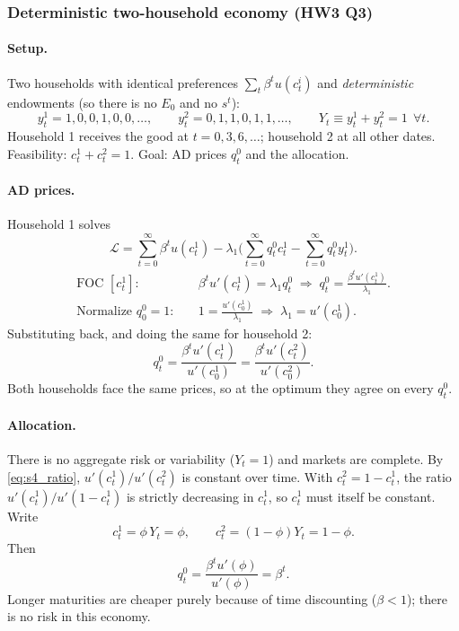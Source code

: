 \subsubsection{Deterministic two-household economy (HW3 Q3)}
\paragraph{Setup.} Two households with identical preferences $\sum_t\beta^tu(c^i_t)$ and \emph{deterministic} endowments (so there is no $E_0$ and no $s^t$):
\[
  y^1_t = 1,0,0,1,0,0,\dots,\qquad y^2_t = 0,1,1,0,1,1,\dots,
  \qquad Y_t \equiv y^1_t+y^2_t = 1\ \ \forall t.
\]
Household 1 receives the good at $t=0,3,6,\dots$; household 2 at all other dates. Feasibility: $c^1_t+c^2_t=1$. Goal: AD prices $q^0_t$ and the allocation.

\paragraph{AD prices.} Household 1 solves
\[
\mathcal L = \sum_{t=0}^\infty\beta^tu(c^1_t) - \lambda_1\Big(\sum_{t=0}^\infty q^0_tc^1_t - \sum_{t=0}^\infty q^0_t y^1_t\Big).
\]
\begin{align*}
  \text{FOC } [c^1_t]:&\quad \beta^tu'(c^1_t) = \lambda_1q^0_t
  \;\Rightarrow\; q^0_t = \frac{\beta^tu'(c^1_t)}{\lambda_1}.\\
  \text{Normalize } q^0_0=1:&\quad 1 = \frac{u'(c^1_0)}{\lambda_1}\;\Rightarrow\;\lambda_1=u'(c^1_0).
\end{align*}
Substituting back, and doing the same for household 2:
\[
  q^0_t = \frac{\beta^t u'(c^1_t)}{u'(c^1_0)} = \frac{\beta^t u'(c^2_t)}{u'(c^2_0)}.
\]
Both households face the same prices, so at the optimum they agree on every $q^0_t$.

\paragraph{Allocation.} There is no aggregate risk or variability ($Y_t=1$) and markets are complete. By \eqref{eq:s4_ratio}, $u'(c^1_t)/u'(c^2_t)$ is constant over time. With $c^2_t=1-c^1_t$, the ratio $u'(c^1_t)/u'(1-c^1_t)$ is strictly decreasing in $c^1_t$, so $c^1_t$ must itself be constant. Write
\[
  c^1_t=\phi\,Y_t=\phi,\qquad c^2_t=(1-\phi)Y_t=1-\phi .
\]
Then
\[
  q^0_t = \frac{\beta^tu'(\phi)}{u'(\phi)} = \beta^t.
\]
Longer maturities are cheaper purely because of time discounting ($\beta<1$); there is no risk in this economy.

